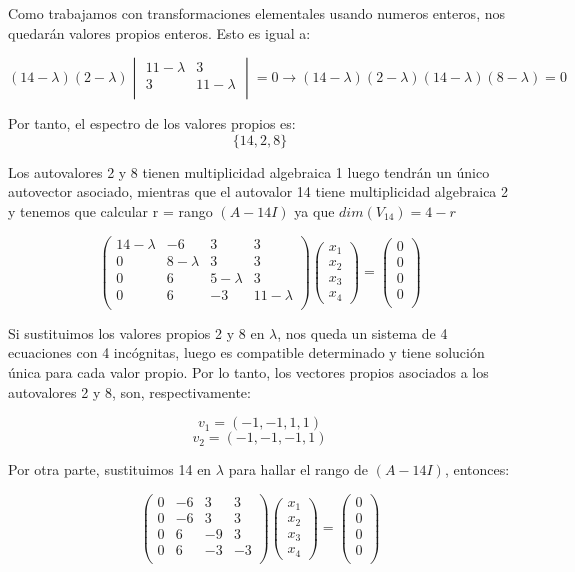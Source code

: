 \documentclass[11pt, a4paper]{article}
\newif\IfInSansMode
\theoremstyle{theorem-style}
\theoremstyle{definition-style}
\theoremstyle{remark-style}
\theoremstyle{example-style}
\begin{document}
Como trabajamos con transformaciones elementales usando numeros enteros, nos quedarán valores propios enteros. Esto es igual a:

$$(14-\lambda)(2-\lambda)\begin{vmatrix}
11-\lambda & 3\\
3 & 11-\lambda \\ 
\end{vmatrix}=0 \rightarrow (14-\lambda)(2-\lambda)(14-\lambda)(8-\lambda)=0$$

Por tanto, el espectro de los valores propios es: $$\{14,2,8\}$$

Los autovalores 2 y 8 tienen multiplicidad algebraica 1 luego tendrán un único autovector asociado, mientras que el autovalor 14 tiene multiplicidad algebraica 2 y tenemos que calcular r = rango $(A-14I)$ ya que $dim(V_{14})=4-r$

$$\begin{pmatrix}
14-\lambda & -6 & 3 & 3\\
0 & 8-\lambda & 3 & 3\\
0 & 6 & 5-\lambda & 3\\
0 & 6 & -3 & 11-\lambda \\ 
\end{pmatrix}\begin{pmatrix}
x_1\\
x_2\\
x_3\\
x_4
\end{pmatrix}=
\begin{pmatrix}
0\\
0\\
0\\
0\\
\end{pmatrix}$$

Si sustituimos los valores propios 2 y 8 en $\lambda$, nos queda un sistema de 4 ecuaciones con 4 incógnitas, luego es compatible determinado y tiene solución única para cada valor propio. Por lo tanto, los vectores propios asociados a los autovalores 2 y 8, son, respectivamente:

$$v_1=(-1,-1,1,1)$$ $$v_2=(-1,-1,-1,1)$$ 

Por otra parte, sustituimos 14 en $\lambda$ para hallar el rango de $(A-14I)$, entonces:

$$\begin{pmatrix}
0 & -6 & 3 & 3\\
0 & -6 & 3 & 3\\
0 & 6 & -9 & 3\\
0 & 6 & -3 & -3 \\ 
\end{pmatrix}\begin{pmatrix}
x_1\\
x_2\\
x_3\\
x_4
\end{pmatrix}=
\begin{pmatrix}
0\\
0\\
0\\
0\\
\end{pmatrix}$$
\end{document}
